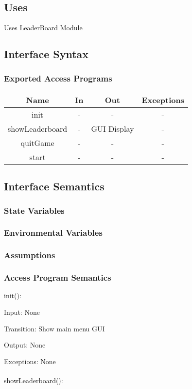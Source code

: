 \documentclass[12,english]{article}
\begin{document}
\subsection{Uses}
Uses LeaderBoard Module
		\subsection{Interface Syntax}
		\subsubsection{Exported Access Programs}
		\begin{tabular}[pos]{|c|c|c|c|}
			
			\hline
			\textbf{Name}& \textbf{In} & \textbf{Out} & \textbf{Exceptions} \\ \hline
			init & - & - & -\\ \hline
			showLeaderboard & - & GUI Display & -\\ \hline
			quitGame & - & - & - \\ \hline
			start & - & - & -\\ \hline
			

		\end{tabular}
		
		\subsection{Interface Semantics}
		\subsubsection{State Variables}
		\subsubsection{Environmental Variables}
		\subsubsection{Assumptions}
    	
		
		\subsubsection{Access Program Semantics}
		init():
		
		Input: None
		
		Transition: Show main menu GUI
		
		Output: None
		
		Exceptions: None\\
		\\
        showLeaderboard():
		
\end{document}
